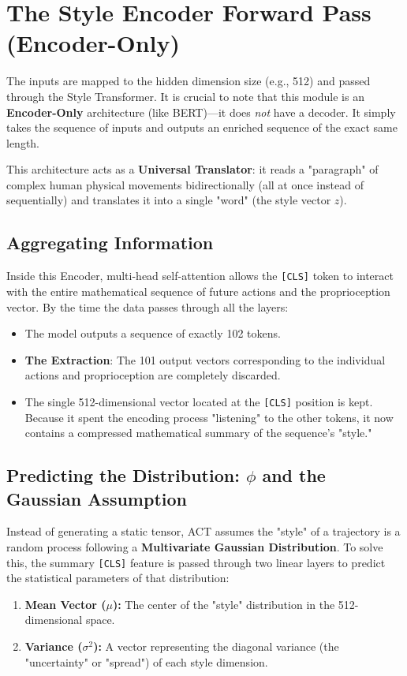 \documentclass[11pt,a4paper]{article}
\begin{document}
\section{The Style Encoder Forward Pass (Encoder-Only)}
The inputs are mapped to the hidden dimension size (e.g., 512) and passed through the Style Transformer. It is crucial to note that this module is an \textbf{Encoder-Only} architecture (like BERT)---it does \textit{not} have a decoder. It simply takes the sequence of inputs and outputs an enriched sequence of the exact same length. 

This architecture acts as a \textbf{Universal Translator}: it reads a "paragraph" of complex human physical movements bidirectionally (all at once instead of sequentially) and translates it into a single "word" (the style vector $z$).

\subsection{Aggregating Information}
Inside this Encoder, multi-head self-attention allows the \texttt{[CLS]} token to interact with the entire mathematical sequence of future actions and the proprioception vector. By the time the data passes through all the layers:
\begin{itemize}
    \item The model outputs a sequence of exactly 102 tokens.
    \item \textbf{The Extraction}: The 101 output vectors corresponding to the individual actions and proprioception are completely discarded.
    \item The single 512-dimensional vector located at the \texttt{[CLS]} position is kept. Because it spent the encoding process "listening" to the other tokens, it now contains a compressed mathematical summary of the sequence's "style."
\end{itemize}

\subsection{Predicting the Distribution: $\phi$ and the Gaussian Assumption}
Instead of generating a static tensor, ACT assumes the "style" of a trajectory is a random process following a \textbf{Multivariate Gaussian Distribution}. To solve this, the summary \texttt{[CLS]} feature is passed through two linear layers to predict the statistical parameters of that distribution:
\begin{enumerate}
    \item \textbf{Mean Vector ($\mu$):} The center of the "style" distribution in the 512-dimensional space.
    \item \textbf{Variance ($\sigma^2$):} A vector representing the diagonal variance (the "uncertainty" or "spread") of each style dimension.
\end{enumerate}
\end{document}
